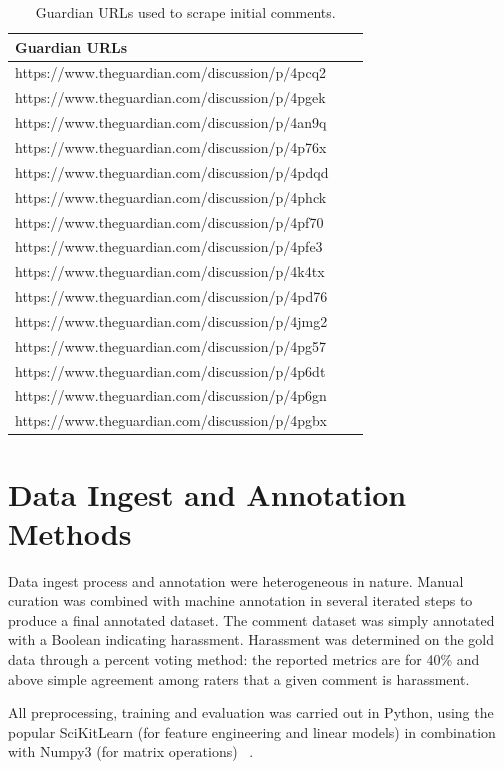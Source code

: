 \documentclass[11pt,a4paper]{article}
\begin{document}
\begin{table}[h]
\begin{center}
\begin{tabular}{|l|rl|}
\hline \bf Guardian URLs \\ \hline
https://www.theguardian.com/discussion/p/4pcq2 \\
https://www.theguardian.com/discussion/p/4pgek \\
https://www.theguardian.com/discussion/p/4an9q \\
https://www.theguardian.com/discussion/p/4p76x \\
https://www.theguardian.com/discussion/p/4pdqd \\
https://www.theguardian.com/discussion/p/4phck \\
https://www.theguardian.com/discussion/p/4pf70 \\
https://www.theguardian.com/discussion/p/4pfe3 \\
https://www.theguardian.com/discussion/p/4k4tx \\
https://www.theguardian.com/discussion/p/4pd76 \\
https://www.theguardian.com/discussion/p/4jmg2 \\
https://www.theguardian.com/discussion/p/4pg57 \\
https://www.theguardian.com/discussion/p/4p6dt \\
https://www.theguardian.com/discussion/p/4p6gn \\
https://www.theguardian.com/discussion/p/4pgbx \\
\hline
\end{tabular}
\end{center}
\caption{\label{font-table} Guardian URLs used to scrape initial comments. }
\end{table}

\section{Data Ingest and Annotation Methods}
Data ingest process and annotation were heterogeneous
in nature. Manual curation was combined
with machine annotation in several iterated steps to
produce a final annotated dataset. The comment dataset
was simply annotated with a Boolean indicating
harassment. Harassment was determined on the
gold data through a percent voting method: the reported
metrics are for 40\% and above simple agreement
among raters that a given comment is harassment.

All preprocessing, training and evaluation was
carried out in Python, using the popular SciKitLearn
(for feature engineering and linear models)
in combination with Numpy3 (for matrix operations)
~\cite{Pedregosa:2011, van_der_Walt:2011}.
\end{document}
